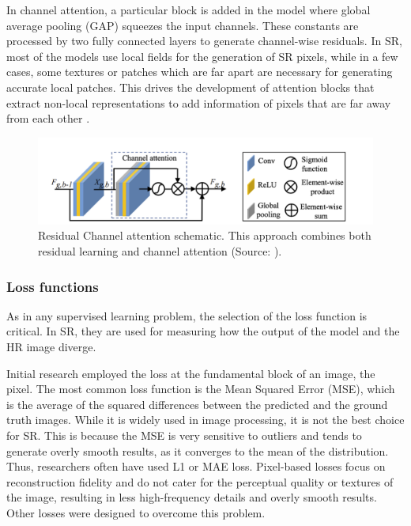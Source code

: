        In channel attention, a particular block is added in the model where global average pooling (GAP) squeezes the input channels. These constants are processed by two fully connected layers to generate channel-wise residuals.
        In SR, most of the models use local fields for the generation of SR pixels, while in a few cases, some textures or patches which are far apart are necessary for generating accurate local patches. This drives the development of attention blocks that extract non-local representations to add information of pixels that are far away from each other \cite{Dai2019}.

        \begin{figure}[H]
            \centering
            \includegraphics[width=\textwidth]{Includes/2-feature-attention.png}
            \caption{Residual Channel attention schematic. This approach combines both residual learning and channel attention (Source: \cite{zhang2018image}).}
            \label{fig:2-feature-attention}
        \end{figure}

        \subsubsection{Loss functions}

        As in any supervised learning problem, the selection of the loss function is critical. In SR, they are used for measuring how the output of the model and the HR image diverge.
        
        Initial research employed the loss at the fundamental block of an image, the pixel.
        The most common loss function is the Mean Squared Error (MSE), which is the average of the squared differences between the predicted and the ground truth images.
        While it is widely used in image processing, it is not the best choice for SR.
        This is because the MSE is very sensitive to outliers and tends to generate overly smooth results, as it converges to the mean of the distribution. Thus, researchers often have used L1 or MAE loss.
        Pixel-based losses focus on reconstruction fidelity and do not cater for the perceptual quality or textures of the image, resulting in less high-frequency details and overly smooth results. Other losses were designed to overcome this problem.

